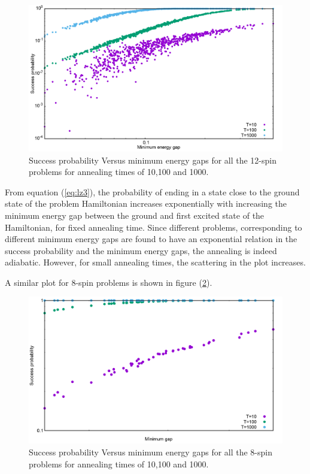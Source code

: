 \documentclass[12]{article}
\begin{document}
\begin{figure}[H]
\centering 
\includegraphics[scale=0.3]{GapVsSucc_s12_T10_100_1000.png}
\caption{Success probability Versus minimum energy gaps for all the 12-spin problems for annealing times of 10,100 and 1000.}
\label{fig:o10}
\end{figure}
From equation (\ref{eq:lz3}), the probability of ending in a state close to the ground state of the problem Hamiltonian increases exponentially with increasing the minimum energy gap between the ground and first excited state of the Hamiltonian, for fixed annealing time. Since different problems, corresponding to different minimum energy gaps are found to have an exponential relation in the success probability and the minimum energy gaps, the annealing is indeed adiabatic. However, for small annealing times, the scattering in the plot increases. 

A similar plot for 8-spin problems is shown in figure (\ref{fig:o11}).
\begin{figure}[H]
\centering 
\includegraphics[scale=0.3]{GapVsSucc_s8_T10_100_1000.png}
\caption{Success probability Versus minimum energy gaps for all the 8-spin problems for annealing times of 10,100 and 1000.}
\label{fig:o11}
\end{figure}
\end{document}
